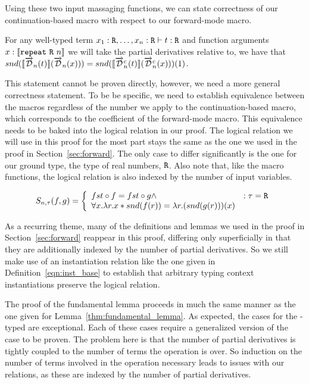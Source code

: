   Using these two input massaging functions, we can state correctness of our continuation-based macro with respect to our forward-mode macro.

  \begin{proposition}
    For any well-typed term $x_1 : \texttt{R}, \dots, x_n : \texttt{R} \vdash t : \texttt{R}$ and function arguments $x : \llbracket \texttt{repeat}\ \texttt{R}\ n \rrbracket$ we will take the partial derivatives relative to, we have that $snd(\llbracket\overrightarrow{\mathcal{D}}_n(t)\rrbracket (\overrightarrow{\mathcal{D}}_n(x))) = snd(\llbracket\overrightarrow{\mathcal{D}}^c_n(t)\rrbracket (\overrightarrow{\mathcal{D}}^c_n(x)))(1)$.
  \end{proposition}

  This statement cannot be proven directly, however, we need a more general correctness statement.
  To be be specific, we need to establish equivalence between the macros regardless of the number we apply to the continuation-based macro, which corresponds to the coefficient of the forward-mode macro.
  This equivalence needs to be baked into the logical relation in our proof.
  The logical relation we will use in this proof for the most part stays the same as the one we used in the proof in Section~\ref{sec:forward}.
  The only case to differ significantly is the one for our ground type, the type of real numbers, $\texttt{R}$.
  Also note that, like the macro functions, the logical relation is also indexed by the number of input variables.

  \begin{equation}
    S_{n, \tau}(f, g) =
      \left\{
        \begin{array}{ll}
          fst \circ f = fst \circ g \wedge
            & : \tau = \texttt{R} \\
          \forall x. \lambda r. x * snd(f(r)) = \lambda r. (snd(g(r)))(x)
        \end{array}
      \right.
  \label{eqn:lr_continuous}
  \end{equation}

  As a recurring theme, many of the definitions and lemmas we used in the proof in Section~\ref{sec:forward} reappear in this proof, differing only superficially in that they are additionally indexed by the number of partial derivatives.
  So we still make use of an instantiation relation like the one given in Definition~\ref{eqn:inst_base} to establish that arbitrary typing context instantiations preserve the logical relation.

  The proof of the fundamental lemma proceeds in much the same manner as the one given for Lemma~\ref{thm:fundamental_lemma}.
  As expected, the cases for the \synR-typed are exceptional.
  Each of these cases require a generalized version of the case to be proven.
  The problem here is that the number of partial derivatives is tightly coupled to the number of terms the operation is over.
  So induction on the number of terms involved in the operation necessary leads to issues with our relations, as these are indexed by the number of partial derivatives.

